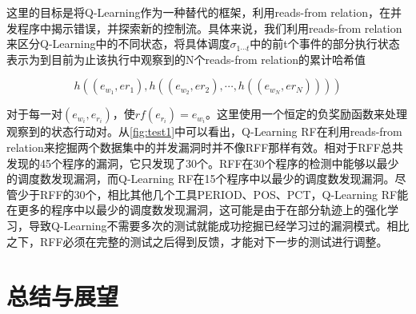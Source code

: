这里的目标是将Q-Learning作为一种替代的框架，利用reads-from relation，在并发程序中揭示错误，并探索新的控制流。具体来说，我们利用reads-from relation来区分Q-Learning中的不同状态，将具体调度$\sigma_{1\cdots t}$中的前t个事件的部分执行状态表示为到目前为止该执行中观察到的N个reads-from relation的累计哈希值

$$
h((e_{w_1}, e{r_1}), h((e_{w_2}, e{r_2}), \cdots, h((e_{w_N}, e{r_N}))))
$$

对于每一对$(e_{w_i}, e_{r_i})$，使$rf(e_{r_i})=e_{w_i}$。这里使用一个恒定的负奖励函数来处理观察到的状态行动对。从\autoref{fig:test1}中可以看出，Q-Learning RF在利用reads-from relation来挖掘两个数据集中的并发漏洞时并不像RFF那样有效。相对于RFF总共发现的45个程序的漏洞，它只发现了30个。RFF在30个程序的检测中能够以最少的调度数发现漏洞，而Q-Learning RF在15个程序中以最少的调度数发现漏洞。尽管少于RFF的30个，相比其他几个工具PERIOD、POS、PCT，Q-Learning RF能在更多的程序中以最少的调度数发现漏洞，这可能是由于在部分轨迹上的强化学习，导致Q-Learning不需要多次的测试就能成功挖掘已经学习过的漏洞模式。相比之下，RFF必须在完整的测试之后得到反馈，才能对下一步的测试进行调整。

\clearpage

\section{总结与展望}




